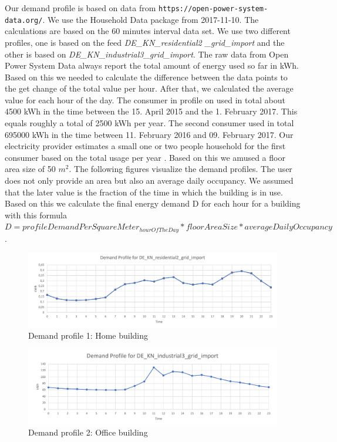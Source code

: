 Our demand profile is based on data from \texttt{https://open-power-system-data.org/}. We use the \glqq{}Household Data\grqq{} package from 2017-11-10. The calculations are based on the 60 minutes interval data set. We use two different profiles, one is based on the feed \textit{DE\_KN\_residential2 \_grid\_import} and the other is based on \textit{DE\_KN\_industrial3\_grid\_import}. The raw data from Open Power System Data always report the total amount of energy used so far in kWh. Based on this we needed to calculate the difference between the data points to the get change of the total value per hour. After that, we calculated the average value for each hour of the day. The consumer in profile on used in total about 4500 kWh in the time between the 15. April 2015 and the 1. February 2017. This equals roughly a total of 2500 kWh per year. The second consumer used in total 695000 kWh in the time between 11. February 2016 and 09. February 2017. Our electricity provider estimates a small one or two people household for the first consumer based on the total usage per year \cite{enbw}. Based on this we amused a floor area size of 50 $m^{2}$. The following figures visualize the demand profiles. The user does not only provide an area but also an average daily occupancy. We assumed that the later value is the fraction of the time in which the building is in use. Based on this we calculate the final energy demand D for each hour for a building with this formula $ D = profileDemandPerSquareMeter_{hourOfTheDay} * floorAreaSize * averageDailyOccupancy$. 

\begin{figure}[!h]
	\centering
	\includegraphics[width=1.00\textwidth]{../figures/profile1.pdf}
	\caption{Demand profile 1: Home building}
	\label{fig:profile1}
\end{figure}

\begin{figure}[!h]
	\centering
	\includegraphics[width=1.00\textwidth]{../figures/profile2.pdf}
	\caption{Demand profile 2: Office building}
	\label{fig:profile2}
\end{figure}
